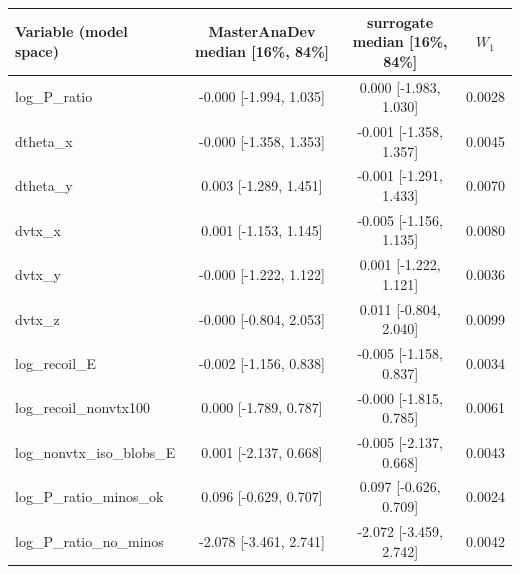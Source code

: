 \begin{tabular}{lccc}
\toprule
Variable (model space) & MasterAnaDev median [16\%, 84\%] & surrogate median [16\%, 84\%] & $W_1$ \\
\midrule
log\_P\_ratio & -0.000 [-1.994, 1.035] & 0.000 [-1.983, 1.030] & 0.0028 \\
dtheta\_x & -0.000 [-1.358, 1.353] & -0.001 [-1.358, 1.357] & 0.0045 \\
dtheta\_y & 0.003 [-1.289, 1.451] & -0.001 [-1.291, 1.433] & 0.0070 \\
dvtx\_x & 0.001 [-1.153, 1.145] & -0.005 [-1.156, 1.135] & 0.0080 \\
dvtx\_y & -0.000 [-1.222, 1.122] & 0.001 [-1.222, 1.121] & 0.0036 \\
dvtx\_z & -0.000 [-0.804, 2.053] & 0.011 [-0.804, 2.040] & 0.0099 \\
log\_recoil\_E & -0.002 [-1.156, 0.838] & -0.005 [-1.158, 0.837] & 0.0034 \\
log\_recoil\_nonvtx100 & 0.000 [-1.789, 0.787] & -0.000 [-1.815, 0.785] & 0.0061 \\
log\_nonvtx\_iso\_blobs\_E & 0.001 [-2.137, 0.668] & -0.005 [-2.137, 0.668] & 0.0043 \\
log\_P\_ratio\_minos\_ok & 0.096 [-0.629, 0.707] & 0.097 [-0.626, 0.709] & 0.0024 \\
log\_P\_ratio\_no\_minos & -2.078 [-3.461, 2.741] & -2.072 [-3.459, 2.742] & 0.0042 \\
\bottomrule
\end{tabular}
